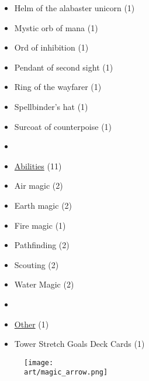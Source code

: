 \begin{multicols}{3}
\begin{itemize}[leftmargin=0pt, label={}, noitemsep, noitemsep]
  \item Helm of the alabaster unicorn (1)
  \item Mystic orb of mana (1)
  \item Ord of inhibition (1)
  \item Pendant of second sight (1)
  \item Ring of the wayfarer (1)
  \item Spellbinder's hat (1)
  \item Surcoat of counterpoise (1)
  \item
  \item \underline{Abilities} (11)
  \item Air magic (2)
  \item Earth magic (2)
  \item Fire magic (1)
  \item Pathfinding (2)
  \item Scouting (2)
  \item Water Magic (2)
  \item
  \item \underline{Other} (1)
  \item Tower Stretch Goals Deck Cards (1)
\end{itemize}

\end{multicols}

\vfill
\begin{figure*}[!hb]
  \centering
  \texttt{[image: \\art/magic\_arrow.png]}
\end{figure*}
\vfill
